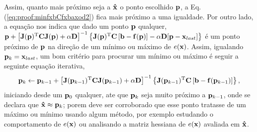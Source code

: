 \begin{myproofT}
Assim, quanto mais próximo seja a $\VECTOR{\hat{x}}$ o ponto escolhido $\VECTOR{p}$, 
a Eq. (\ref{eq:proof:minfxbCfxbaxod2}) fica mais próximo a uma igualdade. Por outro lado,
a equação nos indica que dado um ponto  $\VECTOR{p}$ qualquer,
$\VECTOR{p} +
\left[ \MATRIX{J}(\VECTOR{p})^{\transpose}\MATRIX{C} \MATRIX{J}(\VECTOR{p})+\alpha \MATRIX{D} \right]^{-1}
\left\{ \MATRIX{J}(\VECTOR{p})^{\transpose}\MATRIX{C} \left[\VECTOR{b}-\VECTOR{f}(\VECTOR{p})\right]-\alpha\MATRIX{D}[\VECTOR{p}-\VECTOR{x}_{last}]\right\}$
é um ponto próximo de $\VECTOR{p}$  na direção de um mínimo ou máximo de $ e(\VECTOR{x})$.
Assim, igualando $\VECTOR{p}_{k}=\VECTOR{x}_{last}$,  um bom critério para procurar um mínimo ou máximo é seguir a seguinte 
equação iterativa,
\begin{equation}\label{eq:proof:minfxbCfxbaxod3a}
 \VECTOR{p}_{k} \leftarrow \VECTOR{p}_{k-1} +
\left[ \MATRIX{J}(\VECTOR{p}_{k-1})^{\transpose}\MATRIX{C} \MATRIX{J}(\VECTOR{p}_{k-1})+\alpha \MATRIX{D} \right]^{-1}
\left\{ \MATRIX{J}(\VECTOR{p}_{k-1})^{\transpose}\MATRIX{C} \left[\VECTOR{b}-\VECTOR{f}(\VECTOR{p}_{k-1})\right] \right\},
\end{equation}
iniciando desde um $\VECTOR{p}_{0}$ qualquer, ate que $\VECTOR{p}_{k}$ seja muito próximo a $\VECTOR{p}_{k-1}$,
onde se declara que $\VECTOR{\hat{x}} \approx \VECTOR{p}_{k}$; porem deve ser corroborado
que esse ponto tratasse de um máximo ou mínimo usando algum método, por exemplo estudando o comportamento 
de $e(\VECTOR{x})$ ou analisando a matriz hessiana de $e(\VECTOR{x})$ avaliada em $\VECTOR{\hat{x}}$.
\end{myproofT}
